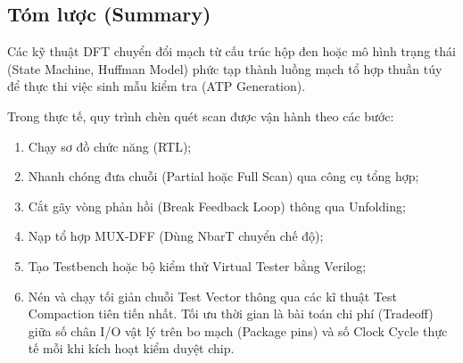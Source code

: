 \subsection{Tóm lược (Summary)}
Các kỹ thuật DFT chuyển đổi mạch từ cấu trúc hộp đen hoặc mô hình trạng thái (State Machine, Huffman Model) phức tạp thành luồng mạch tổ hợp thuần túy để thực thi việc sinh mẫu kiểm tra (ATP Generation). 

Trong thực tế, quy trình chèn quét scan được vận hành theo các bước: 
\begin{enumerate}
    \item Chạy sơ đồ chức năng (RTL);
    \item Nhanh chóng đưa chuỗi (Partial hoặc Full Scan) qua công cụ tổng hợp;
    \item Cắt gãy vòng phản hồi (Break Feedback Loop) thông qua Unfolding;
    \item Nạp tổ hợp MUX-DFF (Dùng NbarT chuyển chế độ);
    \item Tạo Testbench hoặc bộ kiểm thử Virtual Tester bằng Verilog;
    \item Nén và chạy tối giản chuỗi Test Vector thông qua các kĩ thuật Test Compaction tiên tiến nhất. Tối ưu thời gian là bài toán chi phí (Tradeoff) giữa số chân I/O vật lý trên bo mạch (Package pins) và số Clock Cycle thực tế mỗi khi kích hoạt kiểm duyệt chip.
\end{enumerate}
